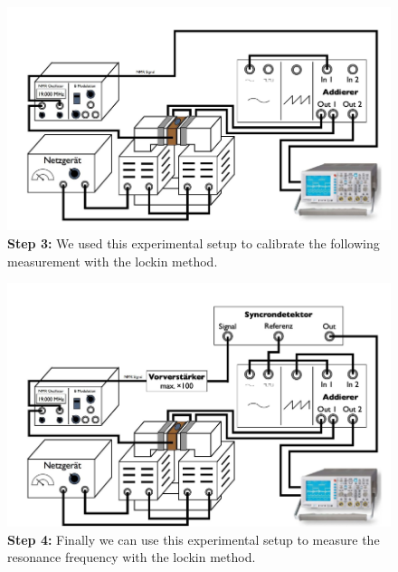 \begin{figure}[htpb]
    \centering
    \includegraphics[width=0.8\linewidth]{figures/setup3}
    \caption{\textbf{Step 3:}
        We used this experimental setup to calibrate the following
        measurement with the lockin method.}
    \label{fig:figures/setup1}
\end{figure}
\begin{figure}[htpb]
    \centering
    \includegraphics[width=0.8\linewidth]{figures/setup4}
    \caption{\textbf{Step 4:}
        Finally we can use this experimental setup to measure
        the resonance frequency with the lockin method.}

    \label{fig:figures/setup1}
\end{figure}
\clearpage




